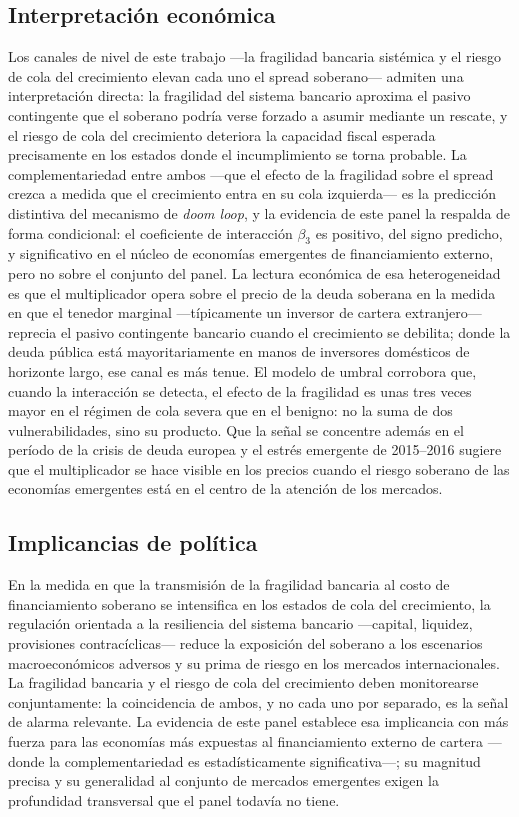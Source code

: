 \subsection{Interpretación económica}

Los canales de nivel de este trabajo —la fragilidad bancaria sistémica y el riesgo de cola del crecimiento elevan cada uno el spread soberano— admiten una interpretación directa: la fragilidad del sistema bancario aproxima el pasivo contingente que el soberano podría verse forzado a asumir mediante un rescate, y el riesgo de cola del crecimiento deteriora la capacidad fiscal esperada precisamente en los estados donde el incumplimiento se torna probable. La complementariedad entre ambos —que el efecto de la fragilidad sobre el spread crezca a medida que el crecimiento entra en su cola izquierda— es la predicción distintiva del mecanismo de \textit{doom loop}, y la evidencia de este panel la respalda de forma condicional: el coeficiente de interacción $\beta_3$ es positivo, del signo predicho, y significativo en el núcleo de economías emergentes de financiamiento externo, pero no sobre el conjunto del panel. La lectura económica de esa heterogeneidad es que el multiplicador opera sobre el precio de la deuda soberana en la medida en que el tenedor marginal —típicamente un inversor de cartera extranjero— reprecia el pasivo contingente bancario cuando el crecimiento se debilita; donde la deuda pública está mayoritariamente en manos de inversores domésticos de horizonte largo, ese canal es más tenue. El modelo de umbral corrobora que, cuando la interacción se detecta, el efecto de la fragilidad es unas tres veces mayor en el régimen de cola severa que en el benigno: no la suma de dos vulnerabilidades, sino su producto. Que la señal se concentre además en el período de la crisis de deuda europea y el estrés emergente de 2015--2016 sugiere que el multiplicador se hace visible en los precios cuando el riesgo soberano de las economías emergentes está en el centro de la atención de los mercados.

\subsection{Implicancias de política}

En la medida en que la transmisión de la fragilidad bancaria al costo de financiamiento soberano se intensifica en los estados de cola del crecimiento, la regulación orientada a la resiliencia del sistema bancario —capital, liquidez, provisiones contracíclicas— reduce la exposición del soberano a los escenarios macroeconómicos adversos y su prima de riesgo en los mercados internacionales. La fragilidad bancaria y el riesgo de cola del crecimiento deben monitorearse conjuntamente: la coincidencia de ambos, y no cada uno por separado, es la señal de alarma relevante. La evidencia de este panel establece esa implicancia con más fuerza para las economías más expuestas al financiamiento externo de cartera —donde la complementariedad es estadísticamente significativa—; su magnitud precisa y su generalidad al conjunto de mercados emergentes exigen la profundidad transversal que el panel todavía no tiene.

